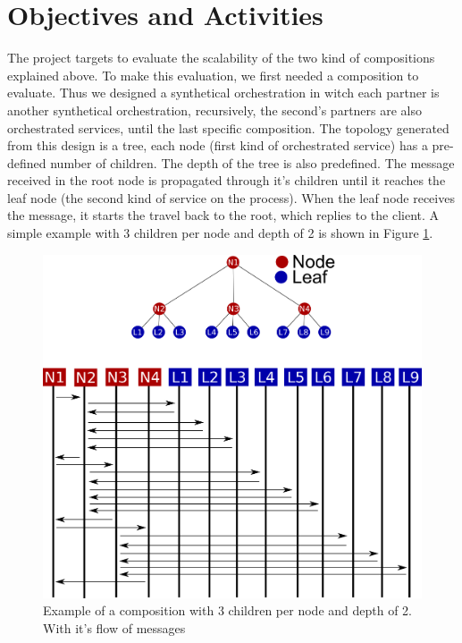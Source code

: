 \section{Objectives and Activities}

The project targets to evaluate the scalability of the two kind of compositions explained above. To make this evaluation, we first needed a composition to evaluate. Thus we designed a synthetical orchestration in witch each partner is another synthetical orchestration, recursively, the second's partners are also orchestrated services, until the last specific composition. The topology generated from this design is a tree, each node (first kind of orchestrated service) has a pre-defined number of children. The depth of the tree is also predefined. The message received in the root node is propagated through it's children until it reaches the leaf node (the second kind of service on the process). When the leaf node receives the message, it starts the travel back to the root, which replies to the client. A simple example with 3 children per node and depth of 2 is shown in Figure \ref{synthetical-example}.

\begin{figure}[htb]
	\centering
	\includegraphics[width=\textwidth]{images/synthetical-example}
	\caption{Example of a composition with 3 children per node and depth of 2. With it's flow of messages}
	\label{synthetical-example}
\end{figure}

